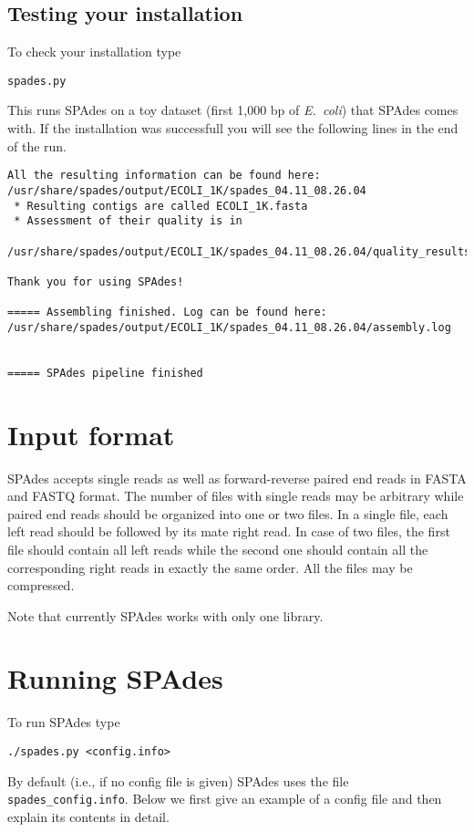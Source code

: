 \documentclass{article}
\def\spades{SPAdes}
\def\ecoli{\it E.~coli}
\begin{document}
\subsection{Testing your installation}
To check your installation type
\begin{lstlisting}
spades.py
\end{lstlisting}
This runs {\spades} on a toy dataset (first 1,000 bp of {\ecoli}) that {\spades} comes with. If the installation was successfull you will see the following lines in the end of the run.
\begin{lstlisting}
All the resulting information can be found here:
/usr/share/spades/output/ECOLI_1K/spades_04.11_08.26.04
 * Resulting contigs are called ECOLI_1K.fasta
 * Assessment of their quality is in
  /usr/share/spades/output/ECOLI_1K/spades_04.11_08.26.04/quality_results/

Thank you for using SPAdes!

===== Assembling finished. Log can be found here:
/usr/share/spades/output/ECOLI_1K/spades_04.11_08.26.04/assembly.log


===== SPAdes pipeline finished
\end{lstlisting}

\section{Input format}
{\spades} accepts single reads as well as forward-reverse paired end reads
in FASTA and FASTQ format. The number of files with single reads may be arbitrary while paired end reads should be organized into one or two files. In a single file, each left read should be followed by its mate right read. In case of two files, the first file should contain all left reads while the second one should contain all the corresponding right reads in exactly the same order. All the files may be compressed.

Note that currently {\spades} works with only one library.

\section{Running {\spades}}\label{sec:running}
To run {\spades} type
\begin{lstlisting}
./spades.py <config.info>
\end{lstlisting}
By default (i.e., if no config file is given) {\spades} uses the file {\tt spades\_config.info}. 
Below we first give an example of a config file
and then explain its contents in detail.
\end{document}
